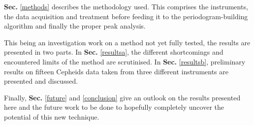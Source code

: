        \noindent \textbf{Sec.} \ref{methods} describes the methodology used. This comprises the instruments, the data acquisition and treatment before feeding it to the periodogram-building algorithm and finally the proper peak analysis.

       \noindent This being an investigation work on a method not yet fully tested, the results are presented in two parts. In \textbf{Sec.} \ref{resultsa}, the different shortcomings and encountered limits of the method are scrutinised. In \textbf{Sec.} \ref{resultsb}, preliminary results on fifteen Cepheids data taken from three different instruments are presented and discussed.

       \noindent Finally, \textbf{Sec.} \ref{future} and \ref{conclusion} give an outlook on the results presented here and the future work to be done to hopefully completely uncover the potential of this new technique.

       

